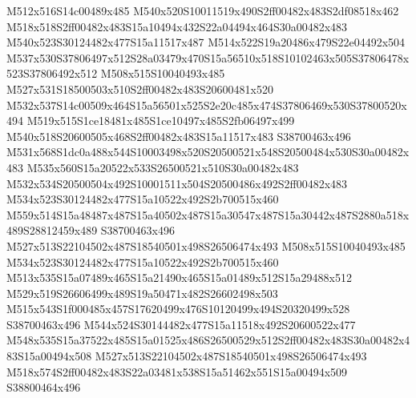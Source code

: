 \documentclass{article}
\begin{document}
\begin{multicols}{2}
M512x516S14c00489x485 M540x520S10011519x490S2ff00482x483S2df08518x462 M518x518S2ff00482x483S15a10494x432S22a04494x464S30a00482x483 M540x523S30124482x477S15a11517x487 M514x522S19a20486x479S22e04492x504 M537x530S37806497x512S28a03479x470S15a56510x518S10102463x505S37806478x523S37806492x512 M508x515S10040493x485 M527x531S18500503x510S2ff00482x483S20600481x520 M532x537S14c00509x464S15a56501x525S2e20c485x474S37806469x530S37800520x494 M519x515S1ce18481x485S1ce10497x485S2fb06497x499 M540x518S20600505x468S2ff00482x483S15a11517x483 S38700463x496 M531x568S1dc0a488x544S10003498x520S20500521x548S20500484x530S30a00482x483 M535x560S15a20522x533S26500521x510S30a00482x483 M532x534S20500504x492S10001511x504S20500486x492S2ff00482x483 M534x523S30124482x477S15a10522x492S2b700515x460 M559x514S15a48487x487S15a40502x487S15a30547x487S15a30442x487S2880a518x489S28812459x489 S38700463x496 M527x513S22104502x487S18540501x498S26506474x493 M508x515S10040493x485 M534x523S30124482x477S15a10522x492S2b700515x460 M513x535S15a07489x465S15a21490x465S15a01489x512S15a29488x512 M529x519S26606499x489S19a50471x482S26602498x503 M515x543S1f000485x457S17620499x476S10120499x494S20320499x528 S38700463x496 M544x524S30144482x477S15a11518x492S20600522x477 M548x535S15a37522x485S15a01525x486S26500529x512S2ff00482x483S30a00482x483S15a00494x508 M527x513S22104502x487S18540501x498S26506474x493 M518x574S2ff00482x483S22a03481x538S15a51462x551S15a00494x509 S38800464x496


\end{multicols}
\end{document}
